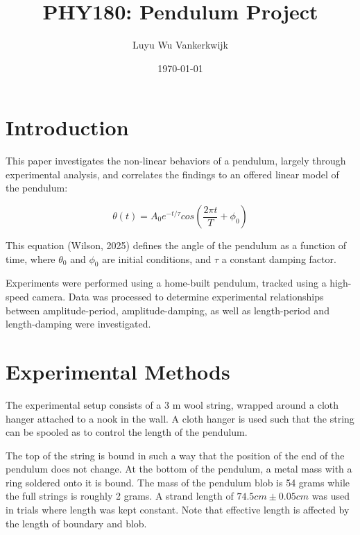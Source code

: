 \documentclass[prl,twocolumn,amsmath,amssymb,superscriptaddress]{revtex4-2}
\begin{document}
\title{PHY180: Pendulum Project}
\author{Luyu Wu Vankerkwijk}
\date{\today}


\maketitle

\section{Introduction}
This paper investigates the non-linear behaviors of a pendulum, largely through experimental analysis, and correlates the findings to an offered linear model of the pendulum:

\begin{equation}
    \theta(t) = A_0e^{-t/\tau}cos\left(\frac{2\pi t}{T}+\phi_0\right)
\end{equation}

This equation (Wilson, 2025) defines the angle of the pendulum as a function of time, where $\theta_0$ and $\phi_0$ are initial conditions, and $\tau$ a constant damping factor.


Experiments were performed using a home-built pendulum, tracked using a high-speed camera. Data was processed to determine experimental relationships between amplitude-period, amplitude-damping, as well as length-period and length-damping were investigated.

\section{Experimental Methods}
The experimental setup consists of a 3 m wool string, wrapped around a cloth hanger attached to a nook in the wall. A cloth hanger is used such that the string can be spooled as to control the length of the pendulum.

The top of the string is bound in such a way that the position of the end of the pendulum does not change. At the bottom of the pendulum, a metal mass with a ring soldered onto it is bound. The mass of the pendulum blob is 54 grams while the full strings is roughly 2 grams. A strand length of $74.5 cm \pm 0.05 cm$ was used in trials where length was kept constant. Note that effective length is affected by the length of boundary and blob.
\end{document}
